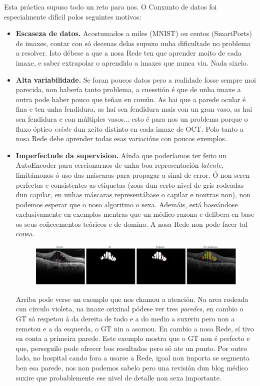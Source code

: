 \documentclass{article}
\begin{document}
Esta práctica supuso todo un reto para nos. O Conxunto de datos foi especialmente difícil polos seguintes motivos:
\begin{itemize}
	\item \textbf{Escaseza de datos.} Acostumados a miles (MNIST) ou centos (SmartPorts) de imaxes, contar con só decenas delas supuxo unha dificultade no problema a resolver. Isto débese a que a nosa Rede ten que aprender moito de cada imaxe, e saber extrapolar o aprendido a imaxes que nunca viu. Nada sixelo.
	\item \textbf{Alta variabilidade.} Se foran poucos datos pero a realidade fosse sempre moi parecida, non habería tanto problema, a cuesstión é que de unha imaxe a outra pode haber pouco que teñan en común. As hai que a parede ocular é fina e ten unha fendidura, as hai sen fendidura mais con un gran vaso, as hai sen fendidura e con múltiples vasos... esto é para nos un problema porque o fluxo óptico \emph{existe} dun xeito distinto en cada imaxe de OCT. Polo tanto a nosa Rede debe aprender todas esas variacións con poucos exemplos.
	\item \textbf{Imperfectude da supervision.} Aínda que poderíamos ter feito un AutoEncoder para cercionarnos de unha boa representación \emph{latente}, limitámonos ó uso das máscaras para propagar a sinal de error. Ó non seren perfectas e consistentes as etiquetas (zoas dun certo nivel de gris rodeadas dun capilar, en unhas máscaras representábase o capilar e noutras non), non podemos esperar que o noso algoritmo o sexa. Ademáis, está baseándose exclusivamente en exemplos mentras que un médico razona e delibera en base os seus coñecementos teóricos e de domino. A nosa Rede non pode facer tal cousa.


\begin{figure}[H]
	\centering
	\includegraphics[width=\linewidth]{figuras/defecto_medico.png}
	\label{fig:defecto_medico}
\end{figure}

Arriba pode verse un exemplo que nos chamou a atención. Na area rodeada cun circulo violeta, na imaxe orixinal pódese ver tres \emph{paredes}, en cambio o GT só respetou á da dereita de todo e a do medio a suxeriu pero non a remetou e a da esquerda, o GT nin a asomou. En cambio a nosa Rede, sí tivo en conta a primeira parede. Este exemplo mostra que o GT non é perfecto e que, perseguilo pode ofrecer bos resultados pero só ate un punto. Por outro lado, no hospital cando fora a usarse a Rede, igoal non importa se segmenta ben esa parede, nos non podemos sabelo pero una revisión dun blog médico \cite{paxinaOCT} suxire que probablemente ese nivel de detalle non sexa importante.

\end{itemize}
\end{document}

